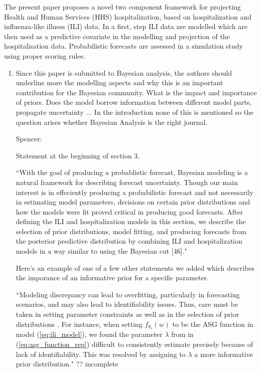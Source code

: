 \documentclass{article}
\newcommand{\spencer}[1]{{\color{blue} Spencer: #1}}
\begin{document}
The present paper proposes a novel two component framework for projecting Health 
and Human Services (HHS) hospitalization, based on hospitalization and 
influenza-like illness (ILI) data. In a first, step ILI data are modelled which 
are then used as a predictive covariate in the modelling and projection of the 
hospitalisation data. Probabilistic forecasts are assessed in a simulation study 
using proper scoring rules.


\begin{enumerate}[1.]

\item Since this paper is submitted to Bayesian analysis, the authors should 
underline more the modelling aspects and why this is an important contribution 
for the Bayesian community. What is the impact and importance of priors. Does 
the model borrow information between different model parts, propagate 
uncertainty ... In the introduction none of this is mentioned so the question 
arises whether Bayesian Analysis is the right journal.

\spencer{

Statement at the beginning of section 3.

``With the goal of producing a probablistic forecast, Bayesian modeling is a 
natural framework for describing forecast uncertainty. 
Though our main interest is in effeciently producing a probabilistic 
forecast and not 
necessarily in estimating model parameters, decisions on certain prior
distributions and how the models were fit proved critical in producing good 
forecasts. After defining the ILI and hospitalization models in this section, 
we describe the 
selection of prior distributions, model fitting, and producing forecasts
from the posterior predictive distribution by combining ILI and hospitalization
models in a way similar to using the 
Bayesian cut [46]."


Here's an example of one of a 
few other statements we added which describes the imporance of 
an informative prior for a 
specific parameter.

``Modeling discrepancy can lead to 
overfitting, particularly in forecasting scenarios, and may also lead to 
identifiability issues. 
Thus, care must be taken in setting parameter constraints as well as in the 
selection of prior distributions \cite[]{osthus2019dynamic,
brynjarsdottir2014learning}. 
For instance, when setting $f_{\theta_s}(w)$ to
be the ASG function
in model (\ref{eq:ili_model}), we found the parameter $\lambda$ from 
in (\ref{eq:asg_function_rep}) difficult to consistently 
estimate precisely because of lack of identifiability. This was resolved by 
assigning to $\lambda$ a more informative prior distribution."
?? incomplete}


\end{enumerate}
\end{document}
